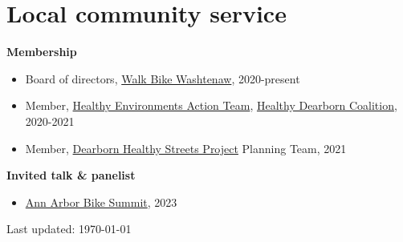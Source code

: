 \documentclass[11pt]{article}
\newenvironment{main}
{\begin{adjustwidth}{3em}{}}
{\end{adjustwidth}}
\begin{document}
\section*{Local community service}
\begin{main}

\textbf{Membership}
\begin{itemize}
    \item Board of directors, \href{https://www.wbwc.org/}{Walk Bike Washtenaw}, 2020-present
    \item Member, \href{https://www.healthydearborn.org/healthy-environments}{Healthy Environments Action Team}, \href{https://www.healthydearborn.org/}{Healthy Dearborn Coalition}, 2020-2021
    \item Member, \href{https://www.healthydearborn.org/dearbornhealthystreets}{Dearborn Healthy Streets Project} Planning Team, 2021
\end{itemize}

\textbf{Invited talk \& panelist}
\begin{itemize}
    \item \href{https://www.eventbrite.com/e/bike-summit-2023-tickets-575020450647?}{Ann Arbor Bike Summit}, 2023
\end{itemize}

\vfill\hfill
Last updated: \today

\end{main}
\end{document}
